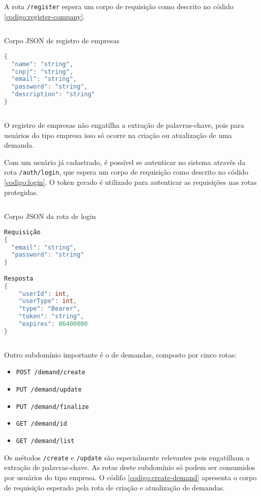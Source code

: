 A rota \texttt{/register} espera um corpo de requisição como descrito no códido \ref{codigo:register-company}.

\begin{sourcecode}[htb]
  \caption{\label{codigo:register-company}Corpo JSON de registro de empresas}
  \begin{lstlisting}[frame=single, language=Java]
{
  "name": "string",
  "cnpj": "string",
  "email": "string",
  "password": "string",
  "description": "string"
}
\end{lstlisting}
  \fonte{}
\end{sourcecode}

O registro de empresas não engatilha a extração de palavras-chave, pois para usuários do tipo empresa isso só ocorre na criação ou atualização de uma demanda.

Com um usuário já cadastrado, é possível se autenticar no sistema através da rota \texttt{/auth/login}, que espera um corpo de requisição como descrito no códido \ref{codigo:login}. O token gerado é utilizado para autenticar as requisições nas rotas protegidas.

\begin{sourcecode}[htb]
  \caption{\label{codigo:login}Corpo JSON da rota de login}
  \begin{lstlisting}[frame=single, language=Java]
Requisição
{
  "email": "string",
  "password": "string"
}

Resposta
{
	"userId": int,
	"userType": int,
	"type": "Bearer",
	"token": "string",
	"expires": 86400000
}
\end{lstlisting}
  \fonte{}
\end{sourcecode}

Outro subdomínio importante é o de demandas, composto por cinco rotas:

\begin{itemize}
  \item \texttt{POST /demand/create}
  \item \texttt{PUT /demand/update}
  \item \texttt{PUT /demand/finalize}
  \item \texttt{GET /demand/{id}}
  \item \texttt{GET /demand/list}
\end{itemize}

Os métodos \texttt{/create} e \texttt{/update} são especialmente relevantes pois engatilham a extração de palavras-chave. As rotas deste subdomínio só podem ser consumidos por usuários do tipo empresa. O códifo \ref{codigo:create-demand} apresenta o corpo de requisição esperado pela rota de criação e atualização de demandas.

